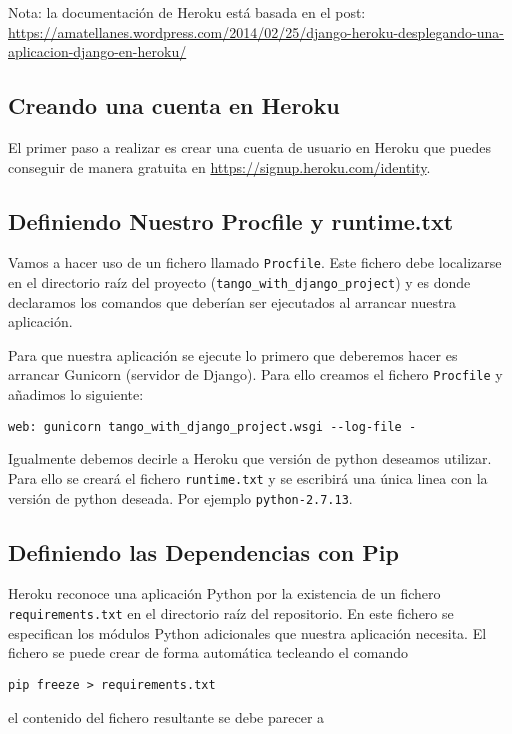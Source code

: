 \documentclass[12pt]{article} %
\begin{document}
Nota: la documentación de Heroku está basada en el post: \url{https://amatellanes.wordpress.com/2014/02/25/django-heroku-desplegando-una-aplicacion-django-en-heroku/}

\subsection{Creando una cuenta en Heroku}
El primer paso a realizar es crear una cuenta de usuario en Heroku que puedes conseguir de manera gratuita en \url{https://signup.heroku.com/identity}.

\subsection{Definiendo Nuestro Procfile y runtime.txt}

Vamos a hacer uso de un fichero llamado \texttt{Procfile}. Este fichero debe localizarse en el directorio raíz del proyecto (\texttt{tango\_with\_django\_project})  y es donde declaramos los comandos que deberían ser ejecutados al arrancar nuestra aplicación. 

Para que nuestra aplicación se ejecute lo primero que deberemos hacer es arrancar Gunicorn (servidor de Django). Para ello creamos el fichero \texttt{Procfile} y añadimos lo siguiente:

\begin{verbatim}
web: gunicorn tango_with_django_project.wsgi --log-file -
\end{verbatim}

Igualmente debemos decirle a Heroku que versión de python deseamos utilizar. Para ello se creará el fichero \texttt{runtime.txt} y se escribirá una única linea con la versión de python deseada. Por ejemplo \texttt{python-2.7.13}.

\subsection{Definiendo las Dependencias con Pip}

Heroku reconoce una aplicación Python por la existencia de un fichero \texttt{requirements.txt} en el directorio raíz del repositorio. En este fichero se especifican los módulos Python adicionales que nuestra aplicación necesita. El fichero se puede crear de forma automática tecleando el comando
\begin{verbatim}
pip freeze > requirements.txt
\end{verbatim}

el contenido del fichero resultante se debe parecer a
\end{document}

